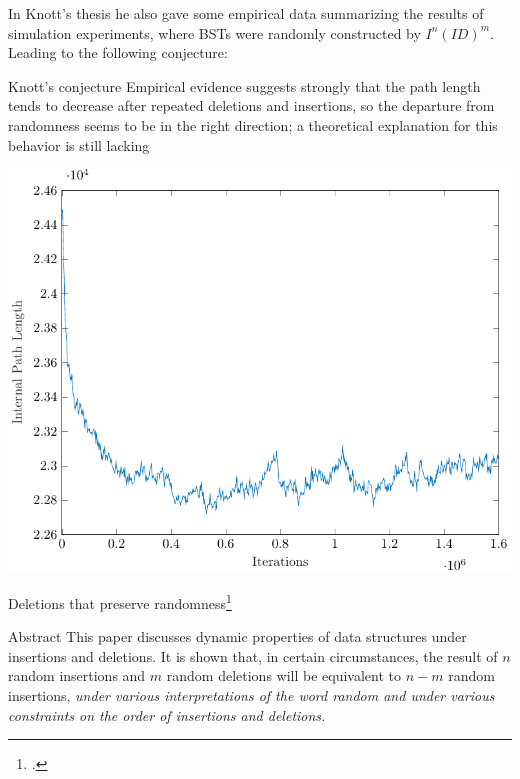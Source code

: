\documentclass{beamer}
\begin{document}
\begin{frame}
    In Knott's thesis he also gave some empirical data summarizing the results of simulation experiments, where BSTs were randomly constructed by $I^n(ID)^m$. Leading to the following conjecture:
    \begin{block}{Knott's conjecture}
        Empirical evidence suggests strongly that the path length tends to decrease after repeated deletions and insertions, so the
        departure from randomness seems to be in the right direction; a theoretical explanation for this behavior is still lacking
    \end{block}
\end{frame}

\begin{frame}
    \begin{center}
        \includegraphics[scale=0.75]{iplDelete.pdf}
    \end{center}
\end{frame}

\begin{frame}{Deletions that preserve randomness\footcite{knuth1977deletions}}
    \begin{block}{Abstract}
        This paper discusses dynamic properties of data structures under
        insertions and deletions. It is shown that, in certain circumstances,
        the result of $n$ random insertions and $m$ random deletions will be
        equivalent to $n-m$ random insertions, \textit{under various interpretations of
            the word \textit{random} and under various constraints on the order of insertions
        and deletions.}
    \end{block}
\end{frame}
\end{document}
